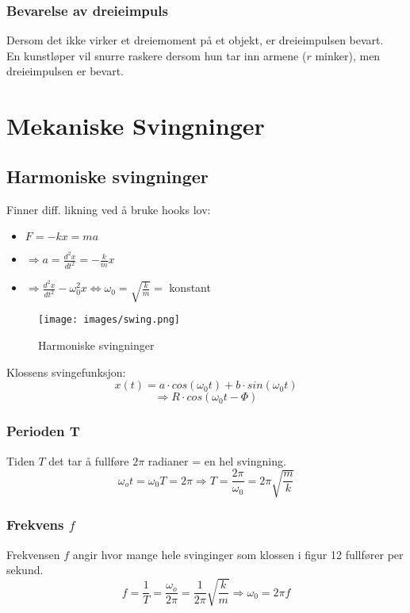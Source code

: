 \documentclass[12pt]{article}
\begin{document}
\subsubsection{Bevarelse av dreieimpuls}
Dersom det ikke virker et dreiemoment på et objekt, er dreieimpulsen bevart.\\
En kunstløper vil snurre raskere dersom hun tar inn armene ($r$ minker), men dreieimpulsen er bevart.

\section{Mekaniske Svingninger}
\subsection{Harmoniske svingninger}
Finner diff. likning ved å bruke hooks lov:
\begin{itemize}
    \item[] $F = -kx = ma$
    \item[] $\Rightarrow a = \frac{d^2x}{dt^2} = -\frac{k}{m}x$
    \item[] $\Rightarrow \frac{d^2x}{dt^2}-\omega_0^2x \Leftrightarrow \omega_0 = \sqrt{\frac{k}{m}} = $ konstant
\end{itemize}
\begin{figure} [H]
    \centering
    \texttt{[image: images/swing.png]}
    \caption{Harmoniske svingninger}
\end{figure}
Klossens svingefunksjon:
$$x(t) = a\cdot cos(\omega_0t) + b\cdot sin(\omega_0t)$$
$$\Rightarrow R \cdot cos(\omega_0t - \Phi)$$
\bigskip
\subsubsection{Perioden T}
Tiden $T$ det tar å  fullføre $2\pi$ radianer = en hel svingning.
$$\omega_ot = \omega_0T = 2\pi \Rightarrow T = \frac{2\pi}{\omega_0} = 2\pi \sqrt{\frac{m}{k}}$$


\subsubsection{Frekvens $f$}
Frekvensen $f$ angir hvor mange hele svinginger som klossen i figur 12 fullfører per sekund.
$$f = \frac{1}{T} = \frac{\omega_o}{2\pi} = \frac{1}{2\pi}\sqrt{\frac{k}{m}} \Rightarrow \omega_0 = 2\pi f$$
\end{document}
